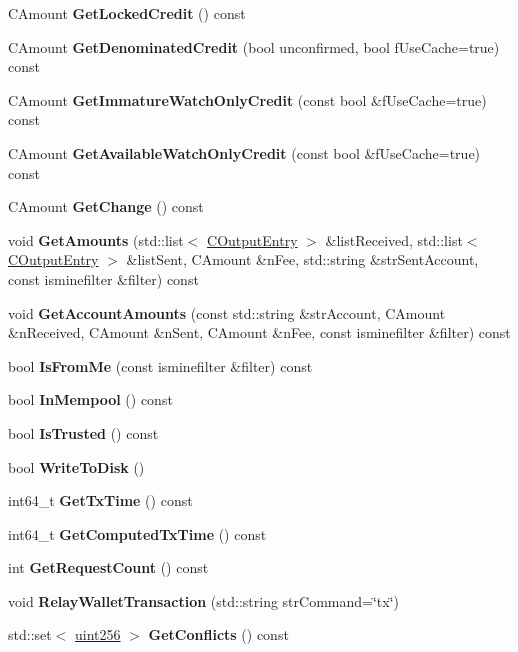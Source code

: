 \begin{DoxyCompactItemize}
C\+Amount {\bfseries Get\+Locked\+Credit} () const
\item 
\mbox{\label{class_c_wallet_tx_add56840ebbe56702eeddbfda1870d628}} 
C\+Amount {\bfseries Get\+Denominated\+Credit} (bool unconfirmed, bool f\+Use\+Cache=true) const
\item 
\mbox{\label{class_c_wallet_tx_a72f8eabb937fe06b415316c2ef4ea510}} 
C\+Amount {\bfseries Get\+Immature\+Watch\+Only\+Credit} (const bool \&f\+Use\+Cache=true) const
\item 
\mbox{\label{class_c_wallet_tx_ac78c4da3c420b2b28370cba7044dd68d}} 
C\+Amount {\bfseries Get\+Available\+Watch\+Only\+Credit} (const bool \&f\+Use\+Cache=true) const
\item 
\mbox{\label{class_c_wallet_tx_a714fe72284e4cc436d84f751a9a7aa60}} 
C\+Amount {\bfseries Get\+Change} () const
\item 
void {\bfseries Get\+Amounts} (std\+::list$<$ \mbox{\hyperlink{struct_c_output_entry}{C\+Output\+Entry}} $>$ \&list\+Received, std\+::list$<$ \mbox{\hyperlink{struct_c_output_entry}{C\+Output\+Entry}} $>$ \&list\+Sent, C\+Amount \&n\+Fee, std\+::string \&str\+Sent\+Account, const isminefilter \&filter) const
\item 
void {\bfseries Get\+Account\+Amounts} (const std\+::string \&str\+Account, C\+Amount \&n\+Received, C\+Amount \&n\+Sent, C\+Amount \&n\+Fee, const isminefilter \&filter) const
\item 
\mbox{\label{class_c_wallet_tx_a4b4fdec025af8171852c3eece1c2508f}} 
bool {\bfseries Is\+From\+Me} (const isminefilter \&filter) const
\item 
bool {\bfseries In\+Mempool} () const
\item 
\mbox{\label{class_c_wallet_tx_a71efb0d5b5def8ae00a1d74b8741bfcb}} 
bool {\bfseries Is\+Trusted} () const
\item 
bool {\bfseries Write\+To\+Disk} ()
\item 
int64\+\_\+t {\bfseries Get\+Tx\+Time} () const
\item 
int64\+\_\+t {\bfseries Get\+Computed\+Tx\+Time} () const
\item 
int {\bfseries Get\+Request\+Count} () const
\item 
void {\bfseries Relay\+Wallet\+Transaction} (std\+::string str\+Command=\char`\"{}tx\char`\"{})
\item 
std\+::set$<$ \mbox{\hyperlink{classuint256}{uint256}} $>$ {\bfseries Get\+Conflicts} () const
\end{DoxyCompactItemize}
